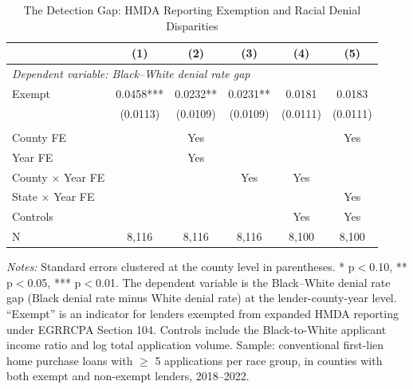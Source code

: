 \begin{table}[H]
\centering
\caption{The Detection Gap: HMDA Reporting Exemption and Racial Denial Disparities}
\label{tab:main}
\begin{threeparttable}
\begin{tabular}{lccccc}
\toprule
& (1) & (2) & (3) & (4) & (5) \\
\midrule
\multicolumn{6}{l}{\textit{Dependent variable: Black--White denial rate gap}} \\
Exempt & 0.0458*** & 0.0232** & 0.0231** & 0.0181 & 0.0183 \\
& (0.0113) & (0.0109) & (0.0109) & (0.0111) & (0.0111) \\
\\
County FE & & Yes & & & Yes \\
Year FE & & Yes & & & \\
County $\times$ Year FE & & & Yes & Yes & \\
State $\times$ Year FE & & & & & Yes \\
Controls & & & & Yes & Yes \\
\midrule
N & 8,116 & 8,116 & 8,116 & 8,100 & 8,100 \\
\bottomrule
\end{tabular}
\begin{tablenotes}[flushleft]\small
\item \textit{Notes:} Standard errors clustered at the county level in parentheses. * p$<$0.10, ** p$<$0.05, *** p$<$0.01. The dependent variable is the Black--White denial rate gap (Black denial rate minus White denial rate) at the lender-county-year level. ``Exempt'' is an indicator for lenders exempted from expanded HMDA reporting under EGRRCPA Section 104. Controls include the Black-to-White applicant income ratio and log total application volume. Sample: conventional first-lien home purchase loans with $\geq$ 5 applications per race group, in counties with both exempt and non-exempt lenders, 2018--2022.
\end{tablenotes}
\end{threeparttable}
\end{table}
